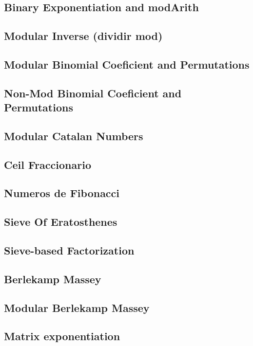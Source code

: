 \subsection{Binary Exponentiation and modArith}
\subsection{Modular Inverse (dividir mod)}
\subsection{Modular Binomial Coeficient and Permutations}
\subsection{Non-Mod Binomial Coeficient and Permutations}
\subsection{Modular Catalan Numbers}
\subsection{Ceil Fraccionario}
\subsection{Numeros de Fibonacci}
\subsection{Sieve Of Eratosthenes}
\subsection{Sieve-based Factorization}
\subsection{Berlekamp Massey}
\subsection{Modular Berlekamp Massey}
\subsection{Matrix exponentiation}

